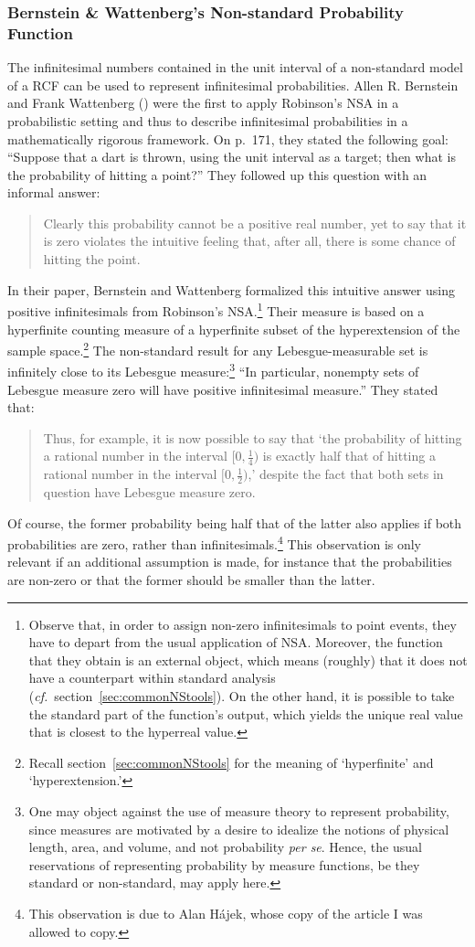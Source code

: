 \subsubsection*{Bernstein \& Wattenberg's Non-standard Probability Function}
The infinitesimal numbers contained in the unit interval of a non-standard model of a RCF can be used to represent infinitesimal probabilities. Allen R. Bernstein and Frank Wattenberg () were the first to apply Robinson's NSA in a probabilistic setting and thus to describe infinitesimal probabilities in a mathematically rigorous framework. On p.~171, they stated the following goal: ``Suppose that a dart is thrown, using the unit interval as a target; then what is the probability of hitting a point?'' They followed up this question with an informal answer:
\begin{quote}
Clearly this probability cannot be a positive real number, yet to say that it is zero violates the intuitive feeling that, after all, there is some chance of hitting the point.
\end{quote}
In their paper, Bernstein and Wattenberg formalized this intuitive answer using positive infinitesimals from Robinson's NSA.\footnote{Observe that, in order to assign non-zero infinitesimals to point events, they have to depart from the usual application of NSA. Moreover, the function that they obtain is an external object, which means (roughly) that it does not have a counterpart within standard analysis (\textit{cf.}\ section~\ref{sec:commonNStools}). On the other hand, it is possible to take the standard part of the function's output, which yields the unique real value that is closest to the hyperreal value.}
Their measure is based on a hyperfinite counting measure of a hyperfinite subset of the hyperextension of the sample space.\footnote{Recall section~\ref{sec:commonNStools} for the meaning of `hyperfinite' and `hyperextension.'}
The non-standard result for any Lebesgue-measurable set is infinitely close to its Lebesgue measure:\footnote{One may object against the use of measure theory to represent probability, since measures are motivated by a desire to idealize the notions of physical length, area, and volume, and not probability \textit{per se}. Hence, the usual reservations of representing probability by measure functions, be they standard or non-standard, may apply here.} ``In particular, nonempty sets of Lebesgue measure zero will have positive infinitesimal measure.''
They stated that:
\begin{quote}
Thus, for example, it is now possible to say that `the probability of hitting a rational number in the interval $[0,\frac{1}{4})$ is exactly half that of hitting a rational number in the interval  $[0, \frac{1}{2})$,' despite the fact that both sets in question have Lebesgue measure zero.
\end{quote}
Of course, the former probability being half that of the latter also applies if both probabilities are zero, rather than infinitesimals.\footnote{This observation is due to Alan H\'ajek, whose copy of the article I was allowed to copy.} This observation is only relevant if an additional assumption is made, for instance that the probabilities are non-zero or that the former should be smaller than the latter.

